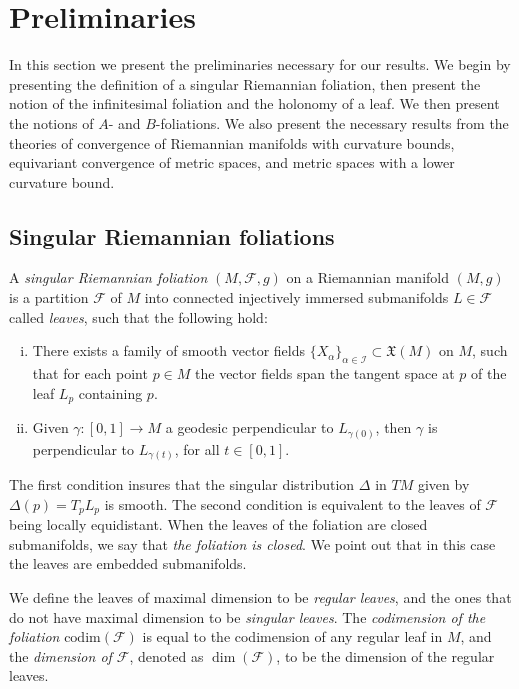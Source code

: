 \documentclass[12pt,a4paper,reqno]{amsart}
\theoremstyle{definition}
\numberwithin{equation}{section}
\newcommand{\fol}{\mathcal{F}}
\begin{document}
\section{Preliminaries}\label{S: Preliminaries}

In this section we present the preliminaries necessary for our results. We begin by presenting the definition of a singular Riemannian foliation, then present the notion of the infinitesimal foliation and the holonomy of a leaf. We then present the notions of $A$- and $B$-foliations. We also present the necessary results from the theories of convergence of Riemannian manifolds  with curvature bounds, equivariant convergence of metric spaces, and metric spaces with a lower curvature bound.

\subsection{Singular Riemannian foliations}\label{SS: Singular Riemannian foliations}

A \emph{singular Riemannian foliation} $(M,\fol,g)$ on a Riemannian manifold $(M,g)$ is a partition $\fol$ of $M$ into connected injectively immersed submanifolds $L\in\fol$ called \emph{leaves}, such that the following hold:
\begin{enumerate}[(i)]
\item There exists a family of smooth vector fields $\{X_\alpha\}_{\alpha\in \mathcal{I}}\subset \mathfrak{X}(M)$ on $M$, such that for each point $p\in M$ the vector fields span the tangent space at $p$ of the leaf $L_p$ containing $p$.
\item Given $\gamma\colon [0,1]\to M$ a geodesic perpendicular to $L_{\gamma(0)}$, then $\gamma$ is perpendicular to $L_{\gamma(t)}$, for all $t\in [0,1]$.
\end{enumerate}

The first condition insures that the singular distribution $\Delta$ in $TM$ given by $\Delta(p) = T_p L_p$ is smooth. The second condition is equivalent to the leaves of  $\fol$ being locally equidistant. When the leaves of the foliation are closed submanifolds, we say that \emph{the foliation is closed}. We point out that in this case the leaves are embedded submanifolds.

We define the leaves of maximal dimension to be \emph{regular leaves}, and the ones that do not have  maximal dimension to be \emph{singular leaves}. The \emph{codimension of the foliation} $\mathrm{codim}(\fol)$ is equal to the codimension of any regular leaf in $M$, and the \emph{dimension of $\fol$}, denoted as $\dim(\fol)$, to be the dimension of the regular leaves.
\end{document}
